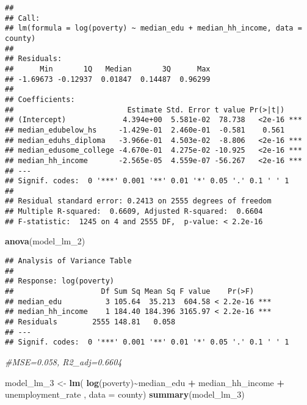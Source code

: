 \documentclass[
]{article}
\newenvironment{Shaded}{\begin{snugshade}}{\end{snugshade}}
\newcommand{\AttributeTok}[1]{\textcolor[rgb]{0.13,0.29,0.53}{#1}}
\newcommand{\CommentTok}[1]{\textcolor[rgb]{0.56,0.35,0.01}{\textit{#1}}}
\newcommand{\FunctionTok}[1]{\textcolor[rgb]{0.13,0.29,0.53}{\textbf{#1}}}
\newcommand{\NormalTok}[1]{#1}
\newcommand{\OtherTok}[1]{\textcolor[rgb]{0.56,0.35,0.01}{#1}}
\newcommand{\SpecialCharTok}[1]{\textcolor[rgb]{0.81,0.36,0.00}{\textbf{#1}}}
\begin{document}
\begin{verbatim}
## 
## Call:
## lm(formula = log(poverty) ~ median_edu + median_hh_income, data = county)
## 
## Residuals:
##      Min       1Q   Median       3Q      Max 
## -1.69673 -0.12937  0.01847  0.14487  0.96299 
## 
## Coefficients:
##                          Estimate Std. Error t value Pr(>|t|)    
## (Intercept)             4.394e+00  5.581e-02  78.738   <2e-16 ***
## median_edubelow_hs     -1.429e-01  2.460e-01  -0.581    0.561    
## median_eduhs_diploma   -3.966e-01  4.503e-02  -8.806   <2e-16 ***
## median_edusome_college -4.670e-01  4.275e-02 -10.925   <2e-16 ***
## median_hh_income       -2.565e-05  4.559e-07 -56.267   <2e-16 ***
## ---
## Signif. codes:  0 '***' 0.001 '**' 0.01 '*' 0.05 '.' 0.1 ' ' 1
## 
## Residual standard error: 0.2413 on 2555 degrees of freedom
## Multiple R-squared:  0.6609, Adjusted R-squared:  0.6604 
## F-statistic:  1245 on 4 and 2555 DF,  p-value: < 2.2e-16
\end{verbatim}

\begin{Shaded}
\begin{Highlighting}[]
\FunctionTok{anova}\NormalTok{(model\_lm\_2)}
\end{Highlighting}
\end{Shaded}

\begin{verbatim}
## Analysis of Variance Table
## 
## Response: log(poverty)
##                    Df Sum Sq Mean Sq F value    Pr(>F)    
## median_edu          3 105.64  35.213  604.58 < 2.2e-16 ***
## median_hh_income    1 184.40 184.396 3165.97 < 2.2e-16 ***
## Residuals        2555 148.81   0.058                      
## ---
## Signif. codes:  0 '***' 0.001 '**' 0.01 '*' 0.05 '.' 0.1 ' ' 1
\end{verbatim}

\begin{Shaded}
\begin{Highlighting}[]
\CommentTok{\#MSE=0.058, R2\_adj=0.6604}

\NormalTok{model\_lm\_3 }\OtherTok{\textless{}{-}} \FunctionTok{lm}\NormalTok{( }\FunctionTok{log}\NormalTok{(poverty)}\SpecialCharTok{\textasciitilde{}}\NormalTok{median\_edu }\SpecialCharTok{+}\NormalTok{ median\_hh\_income }\SpecialCharTok{+}\NormalTok{ unemployment\_rate , }\AttributeTok{data =}\NormalTok{ county)}
\FunctionTok{summary}\NormalTok{(model\_lm\_3)}
\end{Highlighting}
\end{Shaded}
\end{document}
